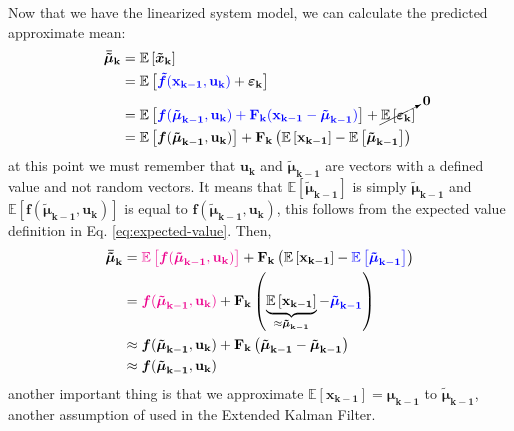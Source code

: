 \documentclass[12pt]{article}
\newcommand{\bvec}[1]{\mathbf{#1}} %
\newcommand{\mat}[1]{\mathbf{#1}}
\newcommand{\brac}[1]{\left[#1\right]} %
\newcommand{\parentheses}[1]{\left(#1\right)}
\newcommand{\mb}[1]{{\boldsymbol{#1}}} %
\newcommand{\expv}[1]{\mathbb{E}\brac{#1}} %
\newcommand{\blue}[1]{\color{blue}#1\color{black}}
\newcommand{\magenta}[1]{\color{magenta}#1\color{black}}
\begin{document}
Now that we have the linearized system model, we can calculate the predicted approximate mean:
\begin{equation*}
\begin{aligned}
    \mb{\bar{\tilde{\mu}}_\mathbf{k}} &= \expv{\mb{\tilde{x}}_\mathbf{k}} \\
    &= \expv{\blue{\mb{\tilde{f}}(\bvec{x_{k-1}, u_k})} + \mb{\varepsilon}_\mathbf{k}}\\
    &= \expv{\blue{\mb{f}(\mb{\tilde\mu}_\mathbf{k-1}, \bvec{u_k}) + \mat{F_k} (\bvec{x_{k-1}} - \mb{\tilde\mu}_\mathbf{k-1})}} + \cancelto{\bvec{0}}{\expv{\mb{\varepsilon}_\mathbf{k}}} \\
    &= \expv{\mb{f}(\mb{\tilde\mu}_\mathbf{k-1}, \bvec{u_k})} + \mat{F_k}\parentheses{\expv{\bvec{x_{k-1}}} - \expv{\mb{\tilde\mu}_\mathbf{k-1}}}
\end{aligned}
\end{equation*}
at this point we must remember that $\bvec{u_k}$ and $\mb{\tilde\mu}_\mathbf{k-1}$ are vectors with a defined value and not random vectors. It means that $\expv{\mb{\tilde\mu}_\mathbf{k-1}}$ is simply $\mb{\tilde\mu}_\mathbf{k-1}$ and $\expv{\mb{f}\parentheses{\mb{\tilde\mu}_\mathbf{k-1}, \bvec{u_k}}}$ is equal to $\mb{f}\parentheses{\mb{\tilde\mu}_\mathbf{k-1}, \bvec{u_k}}$, this follows from the expected value definition in Eq. \ref{eq:expected-value}. Then,
\begin{equation}
    \begin{aligned}
        \mb{\bar{\tilde\mu}}_\mathbf{k} &=    \magenta{\expv{\mb{f}(\mb{\tilde\mu}_\mathbf{k-1}, \bvec{u_k})}} + \mat{F_k}\parentheses{\expv{\bvec{x_{k-1}}} - \blue{\expv{\mb{\tilde\mu}_\mathbf{k-1}}}}\\
        &= \magenta{\mb{f}(\mb{\tilde\mu}_\mathbf{k-1}, \bvec{u_k})} + \mat{F_k}\parentheses{\underbrace{\expv{\bvec{x_{k-1}}}}_{\approx\mb{\tilde\mu}_\mathbf{k-1}} - \blue{\mb{\tilde\mu}_\mathbf{k-1}}}\\
        &\approx \mb{f}(\mb{\tilde\mu}_\mathbf{k-1}, \bvec{u_k}) + \mat{F_k}\parentheses{\mb{\tilde\mu}_\mathbf{k-1} - \mb{\tilde\mu}_\mathbf{k-1}}\\
        &\approx \mb{f}(\mb{\tilde\mu}_\mathbf{k-1}, \bvec{u_k})
    \end{aligned}
\label{eq:ekf-mean-prediction}
\end{equation}
another important thing is that we approximate $\expv{\bvec{x_{k-1}}} = \mb{\mu}_\mathbf{k-1}$ to $\mb{\tilde\mu}_\mathbf{k-1}$, another assumption of used in the Extended Kalman Filter.
\end{document}

